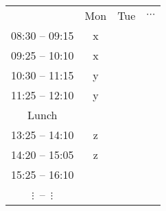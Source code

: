 \begin{tabular}{|c||c|c|c|}
  \hline & Mon & Tue & $\cdots$ \\
  \hhline{|=#=|=|=|}
  08:30 -- 09:15 & x & & \\\hline
  09:25 -- 10:10 & x & & \\\hline
  10:30 -- 11:15 & y & & \\\hline
  11:25 -- 12:10 & y & & \\\hline
  Lunch          &   & & \\\hline
  13:25 -- 14:10 & z & & \\\hline
  14:20 -- 15:05 & z & & \\\hline
  15:25 -- 16:10 &   & & \\\hline
  $\vdots$\quad~--~\quad$\vdots$ & & & \\\hline
\end{tabular}

